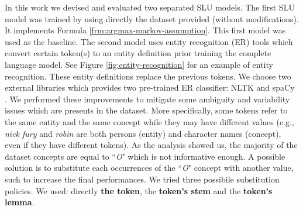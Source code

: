 \documentclass[11pt,a4paper]{article}
\begin{document}
In this work we devised and evaluated two separated SLU models. 
The first SLU model was trained by using directly 
the dataset provided (without modifications). It 
implements Formula \ref{frm:argmax-markov-assumption}. 
This first model was used as the baseline. The second 
model uses entity recognition (ER) tools which convert 
certain token(s) to an entity definition prior training 
the complete language model. See Figure \ref{fig:entity-recognition} for an example of entity recognition. These 
entity definitions replace the previous tokens. We choose two external libraries which provides two pre-trained ER classifier: NLTK \cite{nltk} and spaCy \cite{spacy2}. 
We performed these improvements to mitigate some ambiguity and variability issues which are presents in the dataset. 
More specifically, some tokens refer to the same entity 
and the same concept while they may have different values 
(e.g., \textit{nick fury} and \textit{robin} are both 
persons (entity) and character names (concept), even if 
they have different tokens). 
As the analysis showed us, the majority of the dataset 
concepts  are equal to ``\textit{O}" which is not 
informative enough. A possible solution is to substitute 
each occurrences of the  ``\textit{O}" concept with 
another value, such to increase the final performances.
We tried three possibile substitution policies. We used: 
directly \textbf{the token}, the \textbf{token's stem} and the \textbf{token's lemma}. 
\end{document}
